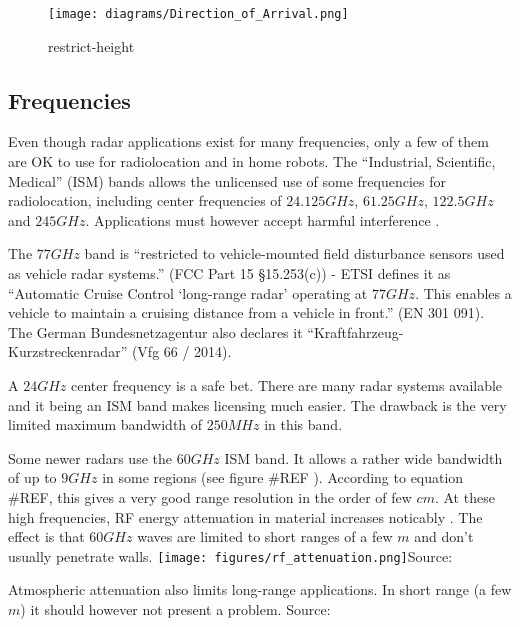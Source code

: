 \begin{figure}
\centering
\texttt{[image: diagrams/Direction\_of\_Arrival.png]}
\caption{restrict-height}
\end{figure}



\cite{Hacker2010} \cite{Cho2017}

\subsection{Frequencies}\label{frequencies}

Even though radar applications exist for many frequencies, only a few of
them are OK to use for radiolocation and in home robots. The
``Industrial, Scientific, Medical'' (ISM) bands allows the unlicensed
use of some frequencies for radiolocation, including center frequencies
of \(24.125 GHz\), \(61.25 GHz\), \(122.5 GHz\) and \(245 GHz\).
Applications must however accept harmful interference \cite{FCC2017}.

The \(77 GHz\) band is ``restricted to vehicle-mounted field disturbance
sensors used as vehicle radar systems.'' (FCC Part 15 §15.253(c)) - ETSI
defines it as ``Automatic Cruise Control `long-range radar' operating at
\(77 GHz\). This enables a vehicle to maintain a cruising distance from
a vehicle in front.'' (EN 301 091). The German Bundesnetzagentur also
declares it ``Kraftfahrzeug-Kurzstreckenradar'' (Vfg 66 / 2014).

A \(24 GHz\) center frequency is a safe bet. There are many radar
systems available and it being an ISM band makes licensing much easier.
The drawback is the very limited maximum bandwidth of \(250MHz\) in this
band.

Some newer radars use the \(60 GHz\) ISM band. It allows a rather wide
bandwidth of up to \(9GHz\) in some regions (see figure \#REF ).
According to equation \#REF, this gives a very good range resolution in
the order of few \(cm\). At these high frequencies, RF energy
attenuation in material increases noticably \cite{FerrisJr.1998}. The
effect is that \(60GHz\) waves are limited to short ranges of a few
\(m\) and don't usually penetrate walls.
\texttt{[image: figures/rf\_attenuation.png]}Source:
\cite{FerrisJr.1998}

Atmospheric attenuation also limits long-range applications. In short
range (a few \(m\)) it should however not present a problem.
%
Source: \cite{ITU1997}

